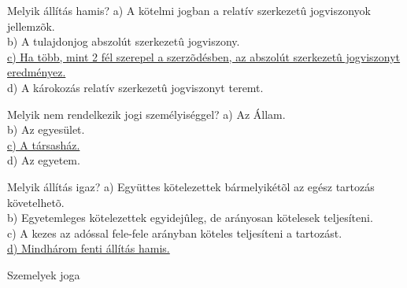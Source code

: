 \begin{frame}

\begin{tcolorbox}[title={37. Kérdés}]
Melyik állítás hamis?
\tcblower
a) A kötelmi jogban a relatív szerkezetû jogviszonyok jellemzõk.\\
b) A tulajdonjog abszolút szerkezetû jogviszony.\\
\uline {c) Ha több, mint 2 fél szerepel a szerzõdésben, az abszolút szerkezetû jogviszonyt eredményez.}\\
d) A károkozás relatív szerkezetû jogviszonyt teremt.
\end{tcolorbox}

\begin{tcolorbox}[title={38. Kérdés}]
Melyik nem rendelkezik jogi személyiséggel?
\tcblower
a) Az Állam.\\
b) Az egyesület.\\
\uline {c) A társasház.}\\
d) Az egyetem.
\end{tcolorbox}

\begin{tcolorbox}[title={39. Kérdés}]
Melyik állítás igaz?
\tcblower
a) Együttes kötelezettek bármelyikétõl az egész tartozás követelhetõ.\\
b) Egyetemleges kötelezettek egyidejûleg, de arányosan kötelesek teljesíteni.\\
c) A kezes az adóssal fele-fele arányban köteles teljesíteni a tartozást.\\
\uline {d) Mindhárom fenti állítás hamis.}
\end{tcolorbox}

\end{frame}

\begin{frame}[plain]
\begin{tcolorbox}[center, colback={myyellow}, coltext={black}, colframe={myyellow}]
    { Szemelyek joga}\\
\end{tcolorbox}
\end{frame}

